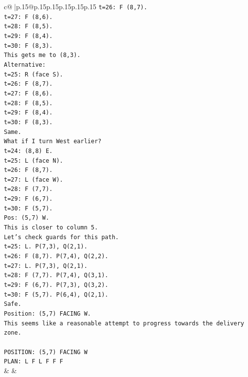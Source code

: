\documentclass{article}
\begin{document}
{\begin{supertabular}{c@{$\;$}|p{.15\linewidth}@{}p{.15\linewidth}p{.15\linewidth}p{.15\linewidth}p{.15\linewidth}p{.15\linewidth}}
{{{\texttt{t=26: F (8,7).} \\
\texttt{t=27: F (8,6).} \\
\texttt{t=28: F (8,5).} \\
\texttt{t=29: F (8,4).} \\
\texttt{t=30: F (8,3).} \\
\texttt{This gets me to (8,3).} \\
\texttt{Alternative:} \\
\texttt{t=25: R (face S).} \\
\texttt{t=26: F (8,7).} \\
\texttt{t=27: F (8,6).} \\
\texttt{t=28: F (8,5).} \\
\texttt{t=29: F (8,4).} \\
\texttt{t=30: F (8,3).} \\
\texttt{Same.} \\
\texttt{What if I turn West earlier?} \\
\texttt{t=24: (8,8) E.} \\
\texttt{t=25: L (face N).} \\
\texttt{t=26: F (8,7).} \\
\texttt{t=27: L (face W).} \\
\texttt{t=28: F (7,7).} \\
\texttt{t=29: F (6,7).} \\
\texttt{t=30: F (5,7).} \\
\texttt{Pos: (5,7) W.} \\
\texttt{This is closer to column 5.} \\
\texttt{Let's check guards for this path.} \\
\texttt{t=25: L. P(7,3), Q(2,1).} \\
\texttt{t=26: F (8,7). P(7,4), Q(2,2).} \\
\texttt{t=27: L. P(7,3), Q(2,1).} \\
\texttt{t=28: F (7,7). P(7,4), Q(3,1).} \\
\texttt{t=29: F (6,7). P(7,3), Q(3,2).} \\
\texttt{t=30: F (5,7). P(6,4), Q(2,1).} \\
\texttt{Safe.} \\
\texttt{Position: (5,7) FACING W.} \\
\texttt{This seems like a reasonable attempt to progress towards the delivery zone.} \\
\\ 
\texttt{POSITION: (5,7) FACING W} \\
\texttt{PLAN: L F L F F F} \\
            }
        }
    }
    & & \\ \\


\end{supertabular}}
\end{document}
